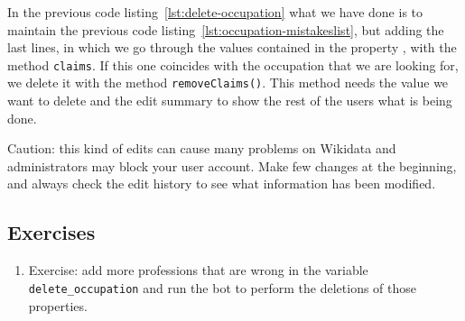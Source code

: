In the previous code listing~\ref{lst:delete-occupation} what we have done is to maintain the previous code listing~\ref{lst:occupation-mistakeslist}, but adding the last lines, in which we go through the values contained in the property , with the method \lstinline|claims|. 
If this one coincides with the occupation that we are looking for, 
we delete it with the method \lstinline|removeClaims()|. 
This method needs the value we want to delete and the edit summary %
 to show the rest of the users what is being done.

Caution: this kind of edits can cause many problems on Wikidata and administrators may block your user account. Make few changes at the beginning, and always check the edit history to see what information has been modified.



\subsection{Exercises}

\begin{enumerate} 
\item Exercise: add more professions that are wrong in the variable \lstinline|delete_occupation| and run the bot to perform the deletions of those properties.
\end{enumerate}
